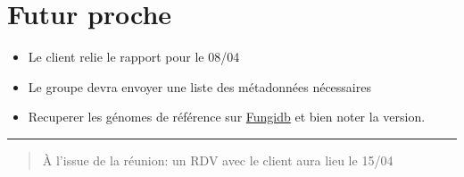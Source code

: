 \documentclass[a4paper, 11pt]{article}
\begin{document}
\section{Futur proche}
\begin{itemize}[itemsep=1pt]
    \item Le client relie le rapport pour le 08/04
    \item Le groupe devra envoyer une liste des métadonnées nécessaires 
    \item Recuperer les génomes de référence sur \href{https://fungidb.org/fungidb/app}{Fungidb} et bien noter la version. 
\end{itemize}

\noindent\rule{8cm}{0.4pt}
\begin{quotation}
    À l'issue de la réunion: un RDV avec le client aura lieu le 15/04
\end{quotation}
\end{document}
